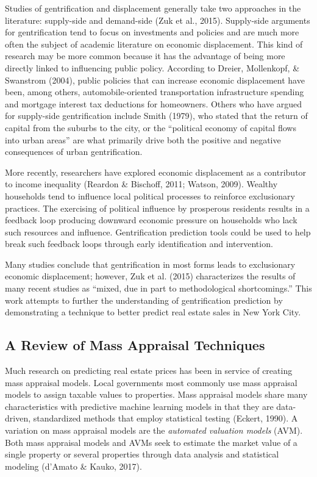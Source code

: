 \documentclass[12pt,]{article}
\begin{document}
Studies of gentrification and displacement generally take two approaches
in the literature: supply-side and demand-side (Zuk et al., 2015).
Supply-side arguments for gentrification tend to focus on investments
and policies and are much more often the subject of academic literature
on economic displacement. This kind of research may be more common
because it has the advantage of being more directly linked to
influencing public policy. According to Dreier, Mollenkopf, \& Swanstrom
(2004), public policies that can increase economic displacement have
been, among others, automobile-oriented transportation infrastructure
spending and mortgage interest tax deductions for homeowners. Others who
have argued for supply-side gentrification include Smith (1979), who
stated that the return of capital from the suburbs to the city, or the
``political economy of capital flows into urban areas'' are what
primarily drive both the positive and negative consequences of urban
gentrification.

More recently, researchers have explored economic displacement as a
contributor to income inequality (Reardon \& Bischoff, 2011; Watson,
2009). Wealthy households tend to influence local political processes to
reinforce exclusionary practices. The exercising of political influence
by prosperous residents results in a feedback loop producing downward
economic pressure on households who lack such resources and influence.
Gentrification prediction tools could be used to help break such
feedback loops through early identification and intervention.

Many studies conclude that gentrification in most forms leads to
exclusionary economic displacement; however, Zuk et al. (2015)
characterizes the results of many recent studies as ``mixed, due in part
to methodological shortcomings.'' This work attempts to further the
understanding of gentrification prediction by demonstrating a technique
to better predict real estate sales in New York City.

\hypertarget{a-review-of-mass-appraisal-techniques}{%
\subsection{A Review of Mass Appraisal
Techniques}\label{a-review-of-mass-appraisal-techniques}}

Much research on predicting real estate prices has been in service of
creating mass appraisal models. Local governments most commonly use mass
appraisal models to assign taxable values to properties. Mass appraisal
models share many characteristics with predictive machine learning
models in that they are data-driven, standardized methods that employ
statistical testing (Eckert, 1990). A variation on mass appraisal models
are the \emph{automated valuation models} (AVM). Both mass appraisal
models and AVMs seek to estimate the market value of a single property
or several properties through data analysis and statistical modeling
(d'Amato \& Kauko, 2017).
\end{document}
